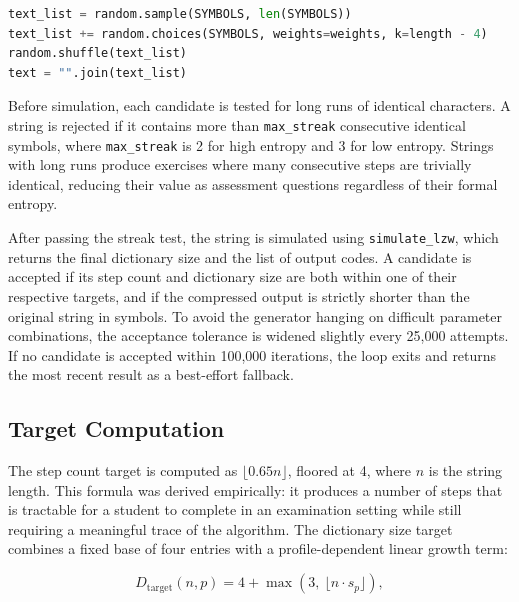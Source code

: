 \documentclass{l4proj}
\begin{document}
\begin{lstlisting}[language=Python, float,
  caption={The candidate string generation procedure. All four symbols are
  guaranteed to appear by seeding with a permutation of the alphabet before
  drawing the remaining characters with profile-dependent weights.},
  label=lst:gencandidate]
text_list = random.sample(SYMBOLS, len(SYMBOLS))
text_list += random.choices(SYMBOLS, weights=weights, k=length - 4)
random.shuffle(text_list)
text = "".join(text_list)
\end{lstlisting}

Before simulation, each candidate is tested for long runs of identical characters. A string is rejected if it contains more than \texttt{max\_streak} consecutive identical symbols, where \texttt{max\_streak} is 2 for high entropy and 3 for low entropy. Strings with long runs produce exercises where many consecutive steps are trivially identical, reducing their value as assessment questions regardless of their formal entropy.

After passing the streak test, the string is simulated using \texttt{simulate\_lzw}, which returns the final dictionary size and the list of output codes. A candidate is accepted if its step count and dictionary size are both within one of their respective targets, and if the compressed output is strictly shorter than the original string in symbols. To avoid the generator hanging on difficult parameter combinations, the acceptance tolerance is widened slightly every 25,000 attempts. If no candidate is accepted within 100,000 iterations, the loop exits and returns the most recent result as a best-effort fallback.

\subsection{Target Computation}

The step count target is computed as $\lfloor 0.65n \rfloor$, floored at 4, where $n$ is the string length. This formula was derived empirically: it produces a number of steps that is tractable for a student to complete in an examination setting while still requiring a meaningful trace of the algorithm. The dictionary size target combines a fixed base of four entries with a profile-dependent linear growth term:

\begin{equation}
    D_{\text{target}}(n, p) = 4 + \max\!\left(3,\ \lfloor n \cdot s_p \rfloor\right),
\end{equation}
\end{document}
